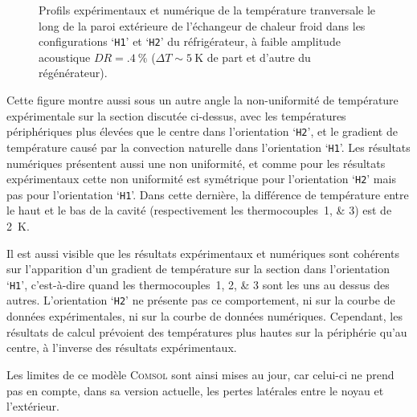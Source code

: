 \begin{figure}[!ht]
    \centering
    
    \caption{Profils expérimentaux et numérique de la température tranversale le long de la paroi extérieure de l'échangeur de chaleur froid dans les configurations `\texttt{H1}' et `\texttt{H2}' du réfrigérateur, à faible amplitude acoustique $DR=\qty{.4}{\percent}$ ($\Delta T \sim \qty{5}{\kelvin}$ de part et d'autre du régénérateur).}
    \label{fig:Comsol_CHXout_H1H2_Low}
\end{figure}

Cette figure montre aussi sous un autre angle la non-uniformité de température expérimentale sur la section discutée ci-dessus, avec les températures périphériques plus élevées que le centre dans l'orientation `\texttt{H2}', et le gradient de température causé par la convection naturelle dans l'orientation `\texttt{H1}'. Les résultats numériques présentent aussi une non uniformité, et comme pour les résultats expérimentaux cette non uniformité est symétrique pour l'orientation `\texttt{H2}' mais pas pour l'orientation `\texttt{H1}'. Dans cette dernière, la différence de température entre le haut et le bas de la cavité (respectivement les thermocouples~\numlist{1;3}) est de \qty{2}{\kelvin}. \smallskip

Il est aussi visible que les résultats expérimentaux et numériques sont cohérents sur l'apparition d'un gradient de température sur la section dans l'orientation `\texttt{H1}', c'est-à-dire quand les thermocouples~\numlist{1;2;3} sont les uns au dessus des autres. L'orientation `\texttt{H2}' ne présente pas ce comportement, ni sur la courbe de données expérimentales, ni sur la courbe de données numériques. Cependant, les résultats de calcul prévoient des températures plus hautes sur la périphérie qu'au centre, à l'inverse des résultats expérimentaux.\smallskip


Les limites de ce modèle \textsc{Comsol} sont ainsi mises au jour, car celui-ci ne prend pas en compte, dans sa version actuelle, les pertes latérales entre le noyau et l'extérieur.\medskip


